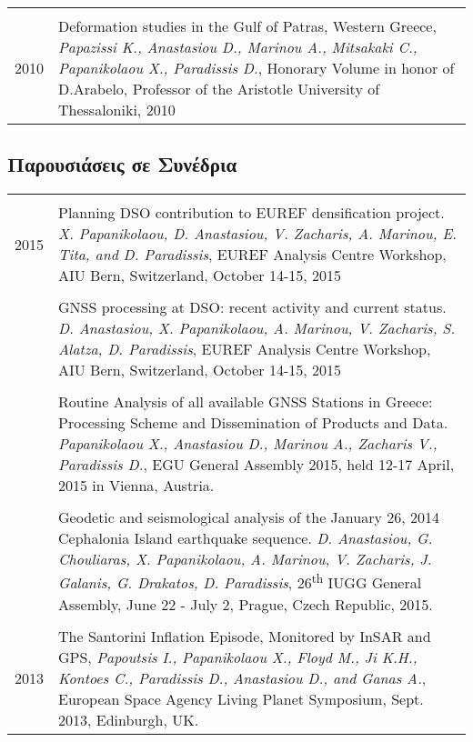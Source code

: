 \documentclass[a4paper,10pt]{article} %
\begin{document}
\begin{longtable}{r|p{14cm}}
\multicolumn{2}{c}{} \\ 
  \textsc{2010}
  & Deformation studies in the Gulf of Patras, Western Greece,
  \emph{Papazissi K., Anastasiou D., Marinou A., Mitsakaki C., Papanikolaou X., Paradissis D.}, 
  Honorary Volume in honor of D.Arabelo, Professor of the Aristotle University of Thessaloniki, 2010\\
\end{longtable}

\subsection*{Παρουσιάσεις σε Συνέδρια}

\begin{longtable}{r|p{14cm}}
\multicolumn{2}{c}{} \\ 
  \textsc{2015}

  & Planning DSO contribution to EUREF densification project.
  \emph{X. Papanikolaou, D. Anastasiou, V. Zacharis, A. Marinou, E. Tita, and D. Paradissis},
  EUREF Analysis Centre Workshop, AIU Bern, Switzerland, October 14-15, 2015\\

  &\\

  & GNSS processing at DSO: recent activity and current status.
  \emph{D. Anastasiou, X. Papanikolaou, A. Marinou, V. Zacharis, S. Alatza, D. Paradissis},
  EUREF Analysis Centre Workshop, AIU Bern, Switzerland, October 14-15, 2015\\

  &\\

  & Routine Analysis of all available GNSS Stations in Greece: Processing Scheme and Dissemination of Products and Data.
  \emph{Papanikolaou X., Anastasiou D., Marinou A., Zacharis V., Paradissis D.},
  EGU General Assembly 2015, held 12-17 April, 2015 in Vienna, Austria.\\

  &\\

  & Geodetic and seismological analysis of the January 26, 2014 Cephalonia Island earthquake sequence.
  \emph{D. Anastasiou, G. Chouliaras, X. Papanikolaou, A. Marinou, V. Zacharis, J. Galanis, G. Drakatos, D. Paradissis},
  26\textsuperscript{th} IUGG General Assembly, June 22 - July 2, Prague, Czech Republic, 2015.\\
  
\multicolumn{2}{c}{} \\
  \textsc{2013}
  & The Santorini Inflation Episode, Monitored by InSAR and GPS,
  \emph{Papoutsis I., Papanikolaou X., Floyd M., Ji K.H., Kontoes C., Paradissis D., Anastasiou D., and Ganas A.},
  European Space Agency Living Planet Symposium, Sept. 2013, Edinburgh, UK.\\


\end{longtable}
\end{document}
